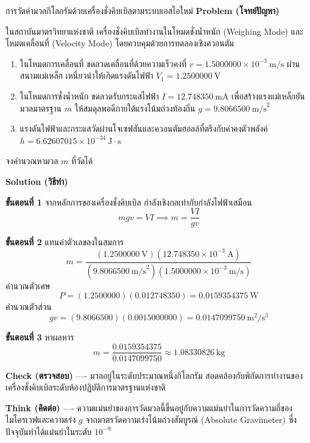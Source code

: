 \begin{psctbox}{การวัดค่ามวลกิโลกรัมด้วยเครื่องชั่งคิบเบิลตามระบบเอสไอใหม่}
\textbf{Problem (โจทย์ปัญหา)}

ในสถาบันมาตรวิทยาแห่งชาติ เครื่องชั่งคิบเบิลทำงานในโหมดชั่งน้ำหนัก (Weighing Mode) และโหมดเคลื่อนที่ (Velocity Mode) โดยควบคุมด้วยการทดลองเชิงควอนตัม
\begin{enumerate}
    \item ในโหมดการเคลื่อนที่ ขดลวดเคลื่อนที่ด้วยความเร็วคงที่ $v = 1.5000000 \times 10^{-3}~\text{m/s}$ ผ่านสนามแม่เหล็ก เหนี่ยวนำให้เกิดแรงดันไฟฟ้า $V_1 = 1.2500000~\text{V}$
    \item ในโหมดการชั่งน้ำหนัก ขดลวดรับกระแสไฟฟ้า $I = 12.748350~\text{mA}$ เพื่อสร้างแรงแม่เหล็กยันมวลมาตรฐาน $m$ ให้สมดุลพอดีภายใต้แรงโน้มถ่วงท้องถิ่น $g = 9.8066500~\text{m/s}^2$
    \item แรงดันไฟฟ้าและกระแสวัดผ่านโจเซฟสันและควอนตัมฮอลล์ที่ตรึงกับค่าคงตัวพลังค์ $h = 6.62607015 \times 10^{-34}~\text{J}\cdot\text{s}$
\end{enumerate}
จงคำนวณหามวล $m$ ที่วัดได้

\textbf{Solution (วิธีทำ)}

\textbf{ขั้นตอนที่ 1} จากหลักการของเครื่องชั่งคิบเบิล กำลังเชิงกลเท่ากับกำลังไฟฟ้าเสมือน
\begin{equation*}
m g v = V I \implies m = \frac{V I}{g v}
\end{equation*}

\textbf{ขั้นตอนที่ 2} แทนค่าตัวเลขลงในสมการ
\begin{equation*}
m = \frac{(1.2500000~\text{V})(12.748350 \times 10^{-3}~\text{A})}{(9.8066500~\text{m/s}^2)(1.5000000 \times 10^{-3}~\text{m/s})}
\end{equation*}
คำนวณตัวเศษ
\begin{equation*}
P = (1.2500000)(0.012748350) = 0.0159354375~\text{W}
\end{equation*}
คำนวณตัวส่วน
\begin{equation*}
g v = (9.8066500)(0.0015000000) = 0.0147099750~\text{m}^2/\text{s}^3
\end{equation*}

\textbf{ขั้นตอนที่ 3} หาผลหาร
\begin{equation*}
m = \frac{0.0159354375}{0.0147099750} \approx 1.08330826~\text{kg}
\end{equation*}

\textbf{Check (ตรวจสอบ)} ---- มวลอยู่ในระดับประมาณหนึ่งกิโลกรัม สอดคล้องกับพิกัดการทำงานของเครื่องชั่งคิบเบิลระดับห้องปฏิบัติการมาตรฐานแห่งชาติ

\textbf{Think (คิดต่อ)} ---- ความแม่นยำของการวัดมวลนี้ขึ้นอยู่กับความแม่นยำในการวัดความถี่ของไมโครเวฟและความเร่ง $g$ จากมาตรวัดความเร่งโน้มถ่วงสัมบูรณ์ (Absolute Gravimeter) ซึ่งปัจจุบันทำได้แม่นยำในระดับ $10^{-9}$
\end{psctbox}

